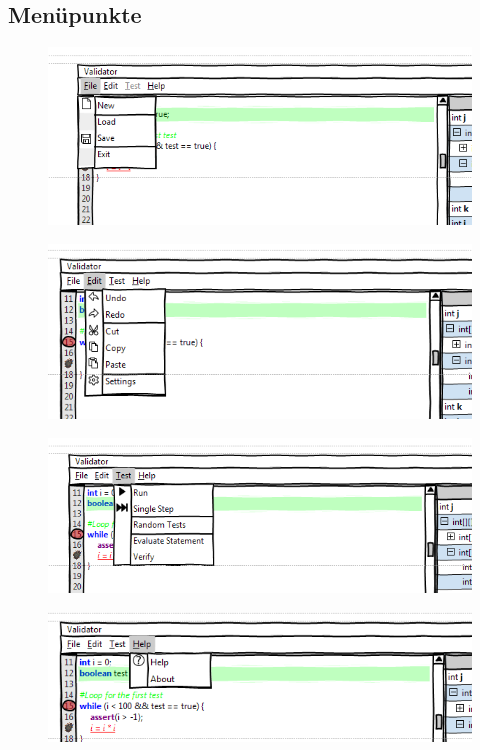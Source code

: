 \documentclass[a4paper,10pt]{article}
\begin{document}
\subsection{Menüpunkte}
\begin{figure}[h!]
\includegraphics[width=\textwidth]{images/menu1.png}
\end{figure}
\begin{figure}[h!]
\includegraphics[width=\textwidth]{images/menu2.png}
\end{figure}
\begin{figure}[h!]
\includegraphics[width=\textwidth]{images/menu3.png}
\end{figure}
\begin{figure}[h!]
\includegraphics[width=\textwidth]{images/menu4.png}
\end{figure}
\end{document}
